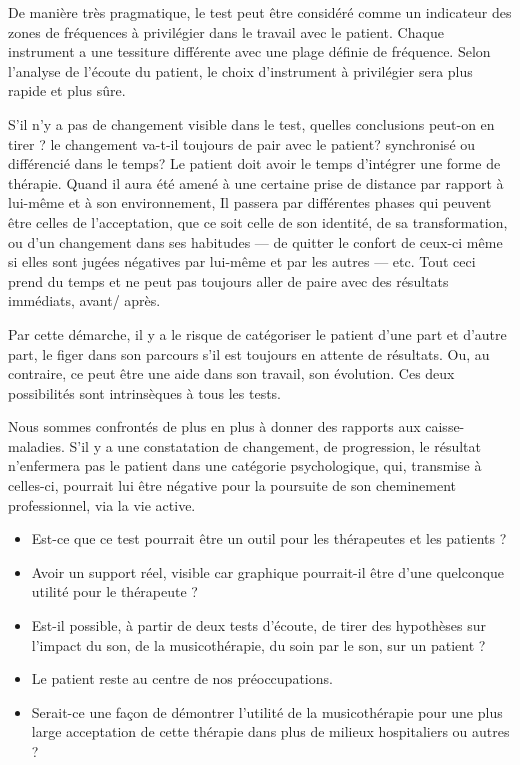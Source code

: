 De manière très pragmatique, le test peut être
considéré comme un indicateur des zones de fréquences à
privilégier dans le travail avec le patient. Chaque instrument a une tessiture
différente avec une plage
définie de fréquence. Selon l'analyse de l'écoute du patient, le choix
d'instrument à privilégier sera plus rapide et plus sûre.
 
S'il n'y a pas de changement visible dans le test, quelles conclusions
peut-on en tirer ? le changement va-t-il toujours de pair avec le
patient? synchronisé ou différencié dans le temps?
Le patient doit avoir le temps d'intégrer une forme de thérapie. Quand il aura été amené à une certaine prise de distance par rapport à lui-même et à son environnement, Il passera par différentes phases qui peuvent être celles de l'acceptation, que ce soit celle de son identité, de sa transformation, ou d'un changement dans ses habitudes --- de quitter le confort de ceux-ci même si elles sont jugées négatives par lui-même et par les autres --- etc. Tout ceci prend du temps et ne peut pas 
toujours  aller de paire avec des résultats immédiats, avant/ après.

Par cette démarche, il y a le risque de catégoriser le patient d'une part
 et d'autre part, le figer dans son parcours s'il est toujours en attente de résultats. Ou, au contraire, ce peut être une aide 
dans son travail, son évolution. Ces deux possibilités sont
intrinsèques à tous les tests.

Nous sommes confrontés de plus en plus à donner des rapports aux caisse-maladies.
S'il y a une constatation de changement, de progression, le résultat
n'enfermera pas le patient dans une catégorie psychologique, qui,
transmise à celles-ci, pourrait lui être négative pour la poursuite
de son cheminement professionnel, via la vie active.





\begin{itemize}
\item Est-ce que ce test pourrait être un outil pour les thérapeutes et
les patients ? 
\item Avoir un support réel, visible car graphique pourrait-il être d'une
quelconque utilité pour le thérapeute ?
\item Est-il possible, à partir de deux tests d'écoute, de tirer des hypothèses
sur l'impact du son, de la musicothérapie, du soin par le son, sur
un patient ?
\item Le patient reste au centre de nos préoccupations.
\item Serait-ce une façon de démontrer l'utilité de la musicothérapie
pour une plus large acceptation de 
cette thérapie dans plus de milieux hospitaliers ou autres ?


\end{itemize}




